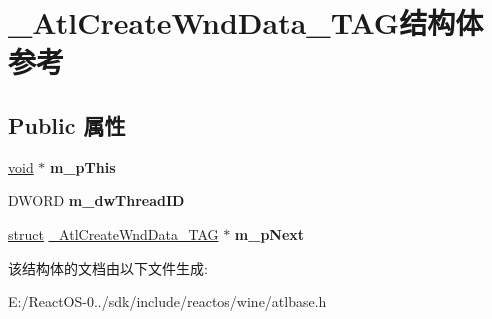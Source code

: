 \hypertarget{struct___atl_create_wnd_data___t_a_g}{}\section{\+\_\+\+Atl\+Create\+Wnd\+Data\+\_\+\+T\+A\+G结构体 参考}
\label{struct___atl_create_wnd_data___t_a_g}
\subsection*{Public 属性}
\begin{DoxyCompactItemize}
\item 
\mbox{\label{struct___atl_create_wnd_data___t_a_g_acddf86ab927b5d2fceff9d10bf503846}} 
\hyperlink{interfacevoid}{void} $\ast$ {\bfseries m\+\_\+p\+This}
\item 
\mbox{\label{struct___atl_create_wnd_data___t_a_g_a1f74b9d210f97e56b10cbc71a39fda71}} 
D\+W\+O\+RD {\bfseries m\+\_\+dw\+Thread\+ID}
\item 
\mbox{\label{struct___atl_create_wnd_data___t_a_g_a85fb26b44cb184ae7c28304a95dc06b1}} 
\hyperlink{interfacestruct}{struct} \hyperlink{struct___atl_create_wnd_data___t_a_g}{\+\_\+\+Atl\+Create\+Wnd\+Data\+\_\+\+T\+AG} $\ast$ {\bfseries m\+\_\+p\+Next}
\end{DoxyCompactItemize}


该结构体的文档由以下文件生成\+:\begin{DoxyCompactItemize}
\item 
E\+:/\+React\+O\+S-\/0../sdk/include/reactos/wine/atlbase.\+h\end{DoxyCompactItemize}
